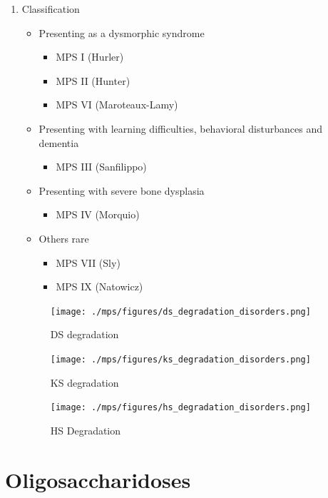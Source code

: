 \documentclass{scrartcl}
\begin{document}
\begin{enumerate}
\item Classification
\label{sec:org28ea466}
\begin{itemize}
\item Presenting as a dysmorphic syndrome
\begin{itemize}
\item MPS I (Hurler)
\item MPS II (Hunter)
\item MPS VI (Maroteaux-Lamy)
\end{itemize}
\item Presenting with learning difficulties, behavioral disturbances and dementia
\begin{itemize}
\item MPS III (Sanfilippo)
\end{itemize}
\item Presenting with severe bone dysplasia
\begin{itemize}
\item MPS IV (Morquio)
\end{itemize}
\item Others rare
\begin{itemize}
\item MPS VII (Sly)
\item MPS IX (Natowicz)
\end{itemize}
\end{itemize}



\begin{figure}[htbp]
\centering
\texttt{[image: ./mps/figures/ds\_degradation\_disorders.png]}
\caption[DS Degradation]{\label{fig:org915a6cc}
DS degradation}
\end{figure}



\begin{figure}[htbp]
\centering
\texttt{[image: ./mps/figures/ks\_degradation\_disorders.png]}
\caption[KS Degradation]{\label{fig:orgadc35b1}
KS degradation}
\end{figure}


\begin{figure}[htbp]
\centering
\texttt{[image: ./mps/figures/hs\_degradation\_disorders.png]}
\caption[HS Degradation]{\label{fig:orgc0edcb1}
HS Degradation}
\end{figure}
\end{enumerate}

\section{Oligosaccharidoses}
\label{sec:orgdc31033}
\end{document}
